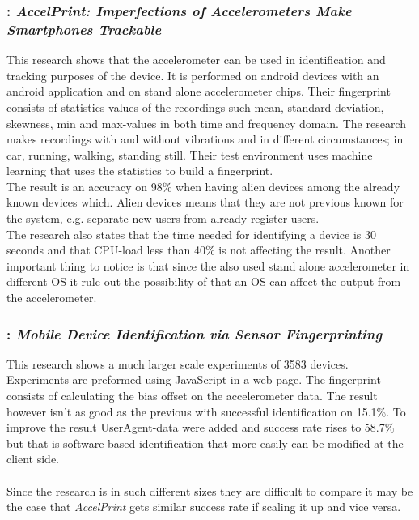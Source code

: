 \subsubsection*{\cite{sensor:accelPrint}: \textit{AccelPrint: Imperfections of Accelerometers Make Smartphones Trackable}}
This research shows that the accelerometer can be used in identification and tracking purposes of the device. It is performed on android devices with an android application and on stand alone accelerometer chips. Their fingerprint consists of statistics values of the recordings such mean, standard deviation, skewness, min and max-values in both time and frequency domain. The research makes recordings with and without vibrations and in different circumstances; in car, running, walking, standing still. Their test environment uses machine learning that uses the statistics to build a fingerprint.\\
The result is an accuracy on 98\% when having alien devices among the already known devices which. Alien devices means that they are not previous known for the system, e.g. separate new users from already register users. \\
The research also states that the time needed for identifying a device is 30 seconds and that CPU-load less than 40\% is not affecting the result. Another important thing to notice is that since the also used stand alone accelerometer in different OS it rule out the possibility of that an OS can affect the output from the accelerometer.~\cite[]{sensor:accelPrint}

\subsubsection*{\cite{sensor:micSpeak}: \textit{Mobile Device Identification via Sensor Fingerprinting}}
This research shows a much larger scale experiments of 3583 devices. Experiments are preformed using JavaScript in a web-page. The fingerprint consists of calculating the bias offset on the accelerometer data. The result however isn't as good as the previous with successful identification on 15.1\%. To improve the result UserAgent-data were added and success rate rises to 58.7\% but that is software-based identification that more easily can be modified at the client side.~\cite[]{sensor:micSpeak}\\
\\
Since the research is in such different sizes they are difficult to compare it may be the case that \textit{AccelPrint} gets similar success rate if scaling it up and vice versa. \\

